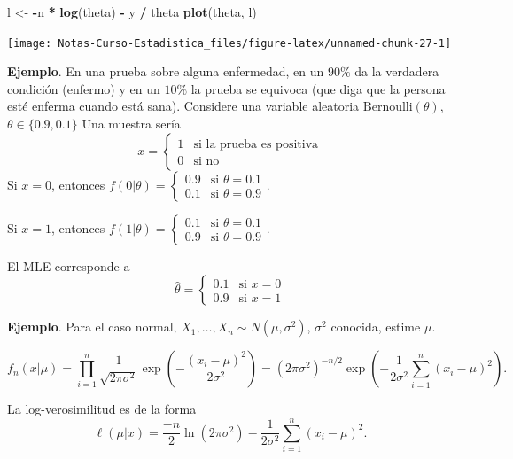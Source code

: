 \documentclass[
  12pt,
]{book}
\newenvironment{Shaded}{\begin{snugshade}}{\end{snugshade}}
\newcommand{\KeywordTok}[1]{\textcolor[rgb]{0.13,0.29,0.53}{\textbf{#1}}}
\newcommand{\NormalTok}[1]{#1}
\newcommand{\OperatorTok}[1]{\textcolor[rgb]{0.81,0.36,0.00}{\textbf{#1}}}
\newcommand{\StringTok}[1]{\textcolor[rgb]{0.31,0.60,0.02}{#1}}
\begin{document}
\begin{Shaded}
\begin{Highlighting}[]
\NormalTok{l \textless{}{-}}\StringTok{ }\OperatorTok{{-}}\NormalTok{n }\OperatorTok{*}\StringTok{ }\KeywordTok{log}\NormalTok{(theta) }\OperatorTok{{-}}\StringTok{ }\NormalTok{y }\OperatorTok{/}\StringTok{ }\NormalTok{theta}
\KeywordTok{plot}\NormalTok{(theta, l)}
\end{Highlighting}
\end{Shaded}

\begin{center}\texttt{[image: Notas-Curso-Estadistica\_files/figure-latex/unnamed-chunk-27-1]} \end{center}

\textbf{Ejemplo}. En una prueba sobre alguna enfermedad, en un \(90\%\) da la verdadera condición (enfermo) y en un \(10\%\) la prueba se equivoca (que diga que la persona esté enferma cuando está sana). Considere una variable aleatoria \(\text{Bernoulli}(\theta)\),\(\theta \in \{0.9,0.1\}\)
Una muestra sería
\[x = \begin{cases}1 & \text{si la prueba es positiva}\\0& \text{si no}\end{cases}\]
Si \(x=0\), entonces \(f(0|\theta) = \begin{cases}0.9 & \text{si }\theta = 0.1\\0.1& \text{si }\theta = 0.9\end{cases}\).

Si \(x=1\), entonces \(f(1|\theta) = \begin{cases}0.1 & \text{si }\theta = 0.1\\0.9& \text{si }\theta = 0.9\end{cases}\).

El MLE corresponde a
\[\hat\theta = \begin{cases}0.1 & \text{si }x= 0\\0.9& \text{si }x= 1\end{cases}\]

\textbf{Ejemplo}. Para el caso normal, \(X_1,\dots, X_n \sim N(\mu,\sigma^2)\), \(\sigma^2\) conocida, estime \(\mu\).

\[f_n(x|\mu) = \prod_{i=1}^n \dfrac{1}{\sqrt{2\pi\sigma^2}}\exp\left(-\dfrac{(x_i-\mu)^2}{2\sigma^2}\right) = (2\pi\sigma^2)^{-n/2}\exp\left(-\dfrac1{2\sigma^2}\sum_{i=1}^n(x_i-\mu)^2\right).\]

La log-verosimilitud es de la forma
\[ \ell(\mu|x) = \dfrac{-n}{2}\ln(2\pi\sigma^2)-\dfrac1{2\sigma^2}\sum_{i=1}^n(x_i-\mu)^2.\]
\end{document}
